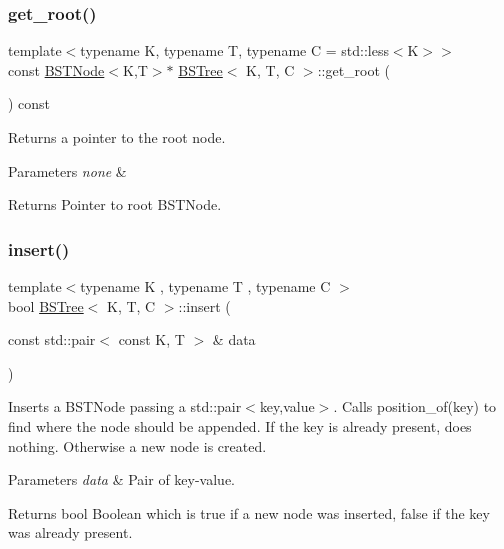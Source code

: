\subsubsection{\texorpdfstring{get\+\_\+root()}{get\_root()}}
{\footnotesize\ttfamily template$<$typename K, typename T, typename C = std\+::less$<$\+K$>$$>$ \\
const \hyperlink{class_node_namespace_1_1_b_s_t_node}{B\+S\+T\+Node}$<$K,T$>$$\ast$ \hyperlink{class_b_s_tree}{B\+S\+Tree}$<$ K, T, C $>$\+::get\+\_\+root (\begin{DoxyParamCaption}{ }\end{DoxyParamCaption}) const\hspace{0.3cm}{\ttfamily [inline]}}



Returns a pointer to the root node. 


\begin{DoxyParams}{Parameters}
{\em none} & \\
\hline
\end{DoxyParams}
\begin{DoxyReturn}{Returns}
Pointer to root B\+S\+T\+Node. 
\end{DoxyReturn}
\mbox{\label{class_b_s_tree_a23746c31f7583acad81c9b7f08159003}} 
\subsubsection{\texorpdfstring{insert()}{insert()}\hspace{0.1cm}{\footnotesize\ttfamily [1/2]}}
{\footnotesize\ttfamily template$<$typename K , typename T , typename C $>$ \\
bool \hyperlink{class_b_s_tree}{B\+S\+Tree}$<$ K, T, C $>$\+::insert (\begin{DoxyParamCaption}\item[{const std\+::pair$<$ const K, T $>$ \&}]{data }\end{DoxyParamCaption})}



Inserts a B\+S\+T\+Node passing a std\+::pair$<$key,value$>$. Calls position\+\_\+of(key) to find where the node should be appended. If the key is already present, does nothing. Otherwise a new node is created. 


\begin{DoxyParams}{Parameters}
{\em data} & Pair of key-\/value. \\
\hline
\end{DoxyParams}
\begin{DoxyReturn}{Returns}
bool Boolean which is true if a new node was inserted, false if the key was already present. 
\end{DoxyReturn}
\mbox{\label{class_b_s_tree_a00ca543914dbdaa89b9c9f6fae7d6555}} 
